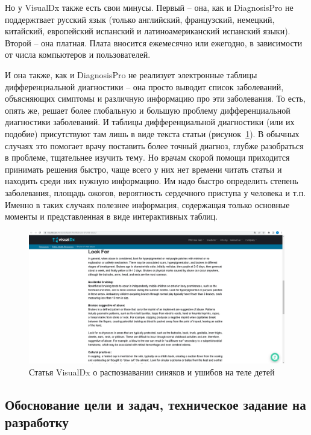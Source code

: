 Но у VisualDx также есть свои минусы. Первый -- она, как и  DiagnosisPro не поддержтвает русский язык (только английский, французский, немецкий, китайский, европейский испанский и латиноамериканский испанский языки). Второй -- она платная. Плата вносится ежемесячно или ежегодно, в зависимости от числа компьютеров и пользователей.

И она также, как и DiagnosisPro не реализует электронные таблицы дифференциальной диагностики -- она просто выводит список заболеваний, объясняющих симптомы и различную информацию про эти заболевания. То есть, опять же, решает более глобальную и большую проблему дифференциальной диагностики заболеваний. И таблицы дифференциальной диагностики (или их подобие) присутствуют там лишь в виде текста статьи (рисунок~\ref{fig:vdx_ex_ac}). В обычных случаях это помогает врачу поставить более точный диагноз, глубже разобраться в проблеме, тщательнее изучить тему. Но врачам скорой помощи приходится принимать решения быстро, чаще всего у них нет времени читать статьи и находить среди них нужную информацию. Им надо быстро определить степень заболевания, площадь ожогов, вероятность сердечного приступа у человека и т.п. Именно в таких случаях полезнее информация, содержащая только основные моменты и представленная в виде интерактивных таблиц.
 
\begin{figure}
  \includegraphics[scale=0.3]{src/vdx_ex_article.png}
  \caption{Статья VisualDx о распознавании синяков и ушибов на теле детей}
  \label{fig:vdx_ex_ac}
\end{figure}

\subsection{Обоснование цели и задач, техническое задание на разработку}

